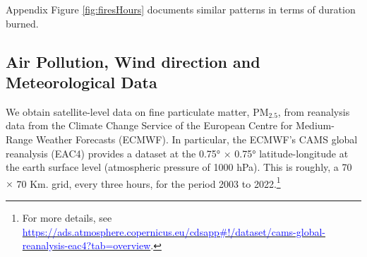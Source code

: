 \documentclass[11pt]{article}
\begin{document}
\begin{spacing}{1.3}
Appendix Figure \ref{fig:firesHours} documents similar patterns in terms of duration burned.






\subsection{Air Pollution, Wind direction and Meteorological Data}
\label{sscn:airdata}

 
We obtain satellite-level data on fine particulate matter, PM$_{2.5}$, from reanalysis data from the Climate Change Service of the European Centre for Medium-Range Weather Forecasts (ECMWF). In particular, the ECMWF's CAMS global reanalysis (EAC4) provides a dataset at the 0.75° $\times$ 0.75° latitude-longitude at the earth surface level (atmospheric pressure of 1000 hPa). This is roughly, a 70 $\times$ 70 Km. grid, every three hours, for the period 2003 to 2022.\footnote{For more details, see \hyperlink{https://ads.atmosphere.copernicus.eu/cdsapp\#!/dataset/cams-global-reanalysis-eac4?tab=overview}{\textcolor{blue}{https://ads.atmosphere.copernicus.eu/cdsapp\#!/dataset/cams-global-reanalysis-eac4?tab=overview}}.}


\end{spacing}
\end{document}
